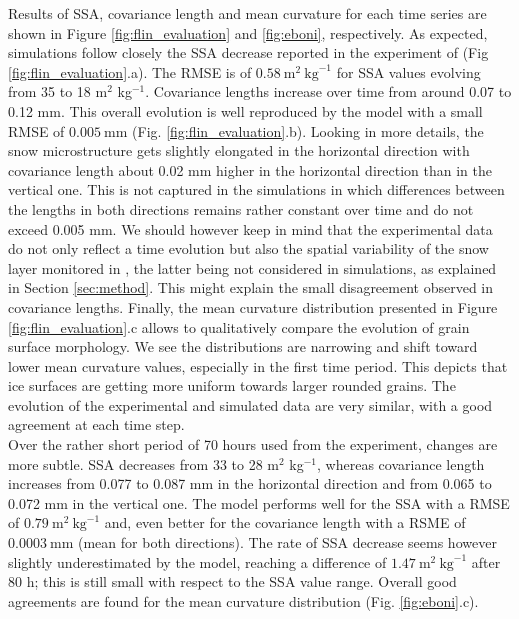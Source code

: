 \documentclass[draft,ms]{agujournal2019}
\begin{document}
Results of SSA, covariance length and mean curvature for each time series are shown in Figure \ref{fig:flin_evaluation} and \ref{fig:eboni}, respectively. As expected, simulations follow closely the SSA decrease reported in the experiment of  (Fig \ref{fig:flin_evaluation}.a).
The RMSE is of $0.58\ \mathrm{m}^2\ \mathrm{kg}^{-1}$ for SSA values evolving from 35 to 18 m$^2$ kg$^{-1}$.
Covariance lengths increase over time from around 0.07 to 0.12 mm. This overall evolution is well reproduced by the model with a small RMSE of $0.005\ \mathrm{mm}$ (Fig. \ref{fig:flin_evaluation}.b). Looking in more details, the snow microstructure gets slightly elongated in the horizontal direction with covariance length about 0.02 mm higher in the horizontal direction than in the vertical one. This is not captured in the simulations in which differences between the lengths in both directions remains rather constant over time and do not exceed 0.005 mm. We should however keep in mind that the experimental data do not only reflect a time evolution but also the spatial variability of the snow layer monitored in , the latter being not considered in simulations, as explained in Section \ref{sec:method}. This might explain the small disagreement observed in covariance lengths.
Finally, the mean curvature distribution presented in Figure \ref{fig:flin_evaluation}.c allows to qualitatively compare the evolution of grain surface morphology. We see the distributions are narrowing and shift toward lower mean curvature values, especially in the first time period. This depicts that ice surfaces are getting more uniform towards larger rounded grains. The evolution of the experimental and simulated data are very similar, with a good agreement at each time step.\\



 Over the rather short period of 70 hours used from the  experiment, changes are more subtle. SSA decreases from 33 to 28 m$^2$ kg$^{-1}$, whereas covariance length increases from 0.077 to 0.087 mm in the horizontal direction and from 0.065 to 0.072 mm in the vertical one. The model performs well for the SSA with a RMSE of $0.79\ \mathrm{m}^2\ \mathrm{kg}^{-1}$ and, even better for the covariance length with a RSME of $0.0003\ \mathrm{mm}$ (mean for both directions).
The rate of SSA decrease seems however slightly underestimated by the model, reaching a difference of $1.47\ \mathrm{m}^2\ \mathrm{kg}^{-1}$ after 80 h; this is still small with respect to the SSA value range.
Overall good agreements are found for the mean curvature distribution (Fig. \ref{fig:eboni}.c). \\
\end{document}
